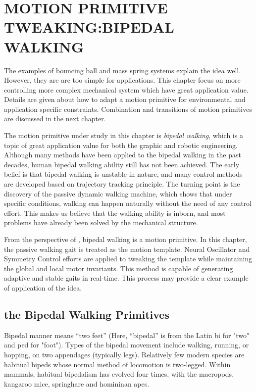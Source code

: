 \chapter{MOTION PRIMITIVE TWEAKING:BIPEDAL WALKING}
\label{chap:walk}
\graphicspath{{BipedWalk/BipedWalkFigs/EPS/}{BipedWalk/BipedWalkFigs/}}


The examples of bouncing ball and mass spring systems explain the idea well.
However, they are are too simple for \cms applications.
This chapter focus on more controlling more complex mechanical system which have great application value.  
Details are given about how to adapt a motion primitive for  environmental and application specific constraints.
Combination and transitions of motion primitives are discussed in the next chapter.


The motion primitive under study in this chapter is \emph{bipedal walking}, which is a topic of great application value for both the graphic and robotic engineering.
Although many methods have been applied to the bipedal walking in the past decades, human bipedal walking ability still has not been achieved. 
The early belief is that bipedal walking is unstable in nature, and many control methods are developed based on trajectory tracking principle.
The turning point is the discovery of the passive dynamic walking machine, which shows that under specific conditions, walking can happen naturally without the need of any control effort.
This makes us believe that the walking ability is inborn, and most problems have already been solved by the mechanical structure.

From the perspective of \moit, bipedal walking is  a motion primitive.
In this chapter, the passive walking gait is treated as the motion template.
Neural Oscillator and Symmetry Control efforts are applied to tweaking the template while maintaining the global and local motor invariants.
This method is capable of generating adaptive and stable gaits in real-time.
This process may provide a clear example of application of the \moit idea.




\section{the Bipedal Walking Primitives}


Bipedal manner means ``two feet'' (Here, ``bipedal'' is from the Latin bi for "two" and ped for "foot"). 
Types of the bipedal movement include walking, running, or hopping, on two appendages (typically legs).
Relatively few modern species are habitual bipeds whose normal method of locomotion is two-legged. 
Within mammals, habitual bipedalism has evolved four times, with the macropods, kangaroo mice, springhare and homininan apes. 

